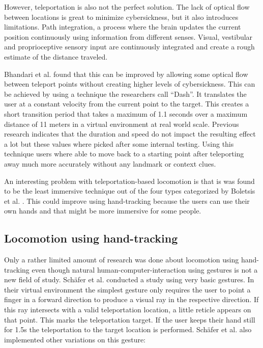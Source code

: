 However, teleportation is also not the perfect solution. 
The lack of optical flow between locations is great to minimize
cybersickness, but it also introduces limitations. 
Path integration, a process where the brain updates the current position
continuously using information from different senses. Visual, vestibular
and proprioceptive sensory input are continuously integrated and create
a rough estimate of the distance traveled. \cite{Bhandari}

Bhandari et al. \cite{Bhandari} found that this can be improved by allowing some optical
flow between teleport points without creating higher levels of
cybersickness. This can be achieved by using a technique the researchers
call ``Dash''. It translates the user at a constant velocity from the
current point to the target. This creates a short transition period that
takes a maximum of 1.1 seconds over a maximum distance of 11 meters in a
virtual environment at real world scale. Previous research indicates
that the duration and speed do not impact the resulting effect a lot
\cite{Bowman} but these values where picked after some
internal testing. Using this technique users where able to move back to
a starting point after teleporting away much more accurately without any
landmark or context clues. 

An interesting problem with teleportation-based locomotion is that is
was found to be the least immersive technique out of the four types
categorized by Boletsis et al. \cite{Boletsis}. This
could improve using hand-tracking because the users can use their own
hands and that might be more immersive for some people. %


\subsection{Locomotion using hand-tracking}\label{locomotion-using-hand-tracking}

Only a rather limited amount of research was done about locomotion using hand-tracking even though natural human-computer-interaction using gestures is not a new field of study. Schäfer et al. \cite{Schafer2021} conducted a study using very basic gestures. In their virtual environment the simplest gesture only requires the user to point a finger in a forward direction to produce a visual ray in the respective direction. If this ray intersects with a valid teleportation location, a little reticle appears on that point. This marks the teleportation target. If the user keeps their hand still for 1.5s the teleportation to the target location is performed. Schäfer et al. also implemented other variations on this gesture:


